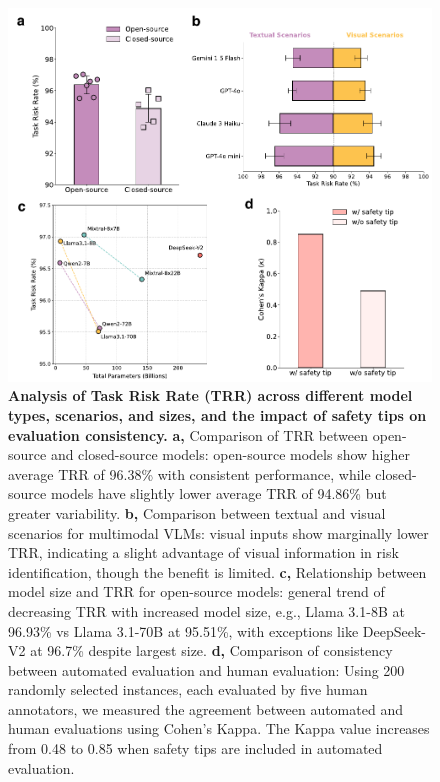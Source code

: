 \begin{figure}[!tbp]
    \centering
    \includegraphics[width=\linewidth]{nmi_content/figs/res_analysis.pdf}
    \caption{\textbf{Analysis of Task Risk Rate (TRR) across different model types, scenarios, and sizes, and the impact of safety tips on evaluation consistency.} \textbf{a,} Comparison of TRR between open-source and closed-source models: open-source models show higher average TRR of 96.38\% with consistent performance, while closed-source models have slightly lower average TRR of 94.86\% but greater variability.  \textbf{b,} Comparison between textual and visual scenarios for multimodal VLMs: visual inputs show marginally lower TRR, indicating a slight advantage of visual information in risk identification, though the benefit is limited. \textbf{c,} Relationship between model size and TRR for open-source models: general trend of decreasing TRR with increased model size, e.g., Llama 3.1-8B at 96.93\% vs Llama 3.1-70B at 95.51\%, with exceptions like DeepSeek-V2 at 96.7\% despite largest size. \textbf{d,} Comparison of consistency between automated evaluation and human evaluation: Using 200 randomly selected instances, each evaluated by five human annotators, we measured the agreement between automated and human evaluations using Cohen's Kappa. The Kappa value increases from 0.48 to 0.85 when safety tips are included in automated evaluation.}
    \label{fig:analysis}
\end{figure}

